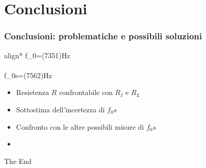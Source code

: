 \documentclass[
	11pt, %
]{beamer}
\begin{document}

\section{Conclusioni}

\begin{frame}[t]
	\frametitle{Conclusioni: problematiche e possibili soluzioni}

	\begin{empheq}[box=\tcbhighmath]{align*}
		f_0=(7351)Hz\\ \\
		f_0s=(7562)Hz
			\end{empheq}
			\vspace{0.5cm}
	\begin{itemize}
		\item Resistenza $R$ confrontabile con $R_I$ e $R_L$ \vspace{0.5cm}
		\item Sottostima dell'incertezza di $f_0s$ \vspace{0.5cm}
		\item Confronto con le altre possibili misure di $f_0s$ \vspace{0.5cm}
		\item 
	\end{itemize}
\end{frame}














\begin{frame}[plain] %
	\begin{center}
		{\Huge The End}
		
		\bigskip\bigskip %
		
		{\LARGE }
	\end{center}
\end{frame}

\end{document}
